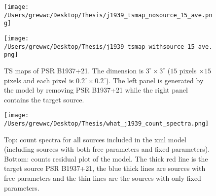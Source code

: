 \documentclass[12pt]{report}
\newcommand{\add}[1]{
  $<$\colorbox{red}{\textbf{add}}$>$#1$<$\colorbox{red}{\textbf{/add}}$>$
}
\begin{document}
            \begin{figure}[!ht]
              \centering
              \begin{minipage}{0.40\textwidth}
                \begin{center} 
                  \texttt{[image: /Users/grewwc/Desktop/Thesis/j1939\_tsmap\_nosource\_15\_ave.png]}
                \end{center}
              \end{minipage}
              \begin{minipage}{0.40\textwidth}
                \begin{center}
                  \texttt{[image: /Users/grewwc/Desktop/Thesis/j1939\_tsmap\_withsource\_15\_ave.png]}
                \end{center}
              \end{minipage}
              \caption{TS maps of PSR B1937+21. The dimension is $3^{\circ} \times 3^{\circ}$
                ($15$ pixels $\times 15$ pixels and each pixel is 
                $0.2^{\circ} \times 0.2^{\circ}$). The left panel is generated by the model 
                by removing PSR B1937+21 while the right panel contains the target source.}
              \label{fig: j1939_tsmap_comparison_15_ave}
            \end{figure}
  

            \begin{figure}
              \centering 
              \texttt{[image: /Users/grewwc/Desktop/Thesis/what\_j1939\_count\_spectra.png]}
              \caption{Top: count spectra for all sources included in the xml model (including 
                sources with both free parameters and fixed parameters). Bottom: counts residual plot
                of the model. The thick red line is the target source PSR B1937+21, the blue thick 
                lines are sources with free parameters and the thin lines are the sources with only 
                fixed parameters.}
              \label{fig: j1939_count_spectra_ave}
            \end{figure}
            

\end{document}
